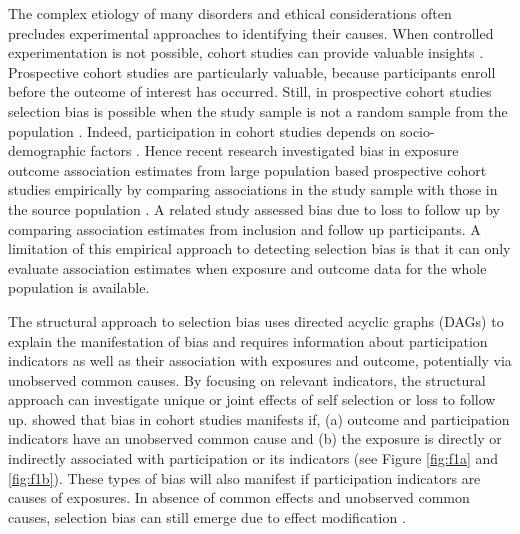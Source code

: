 \documentclass[]{article}
\begin{document}
The complex etiology of many disorders and ethical considerations often precludes experimental approaches to identifying their causes\supercite{Rothman2008-sq}. When controlled experimentation is not possible, cohort studies can provide valuable insights \supercite{Greenland2017-qr}. Prospective cohort studies are particularly valuable, because participants enroll before the outcome of interest has occurred. Still, in prospective cohort studies selection bias is possible when the study sample is not a random sample from the population \supercite{Hernan2004-oz}. Indeed, participation in cohort studies depends on socio-demographic factors \supercite{Galea2007-hv}. Hence recent research investigated bias in exposure outcome association estimates from large population based prospective cohort studies empirically by comparing associations in the study sample with those in the source population \supercite{Nilsen2009-ci, Nohr2006-uf, Hatch2016-us}.
A related study assessed bias due to loss to follow up by comparing association estimates from inclusion and follow up participants\supercite{Greene2011-am}. A limitation of this empirical approach to detecting selection bias is that it can only evaluate association estimates when exposure and outcome data for the whole population is available.

The structural approach to selection bias uses directed acyclic graphs (DAGs)\supercite{Pearl1995-ss} to explain the manifestation of bias and requires information about participation indicators as well as their association with exposures and outcome, potentially via unobserved common causes. By focusing on relevant indicators, the structural approach can investigate unique or joint effects of self selection or loss to follow up. \citeauthor{Hernan2004-oz}\supercite{Hernan2004-oz} showed that bias in cohort studies manifests if, (a) outcome and participation indicators have an unobserved common cause and (b) the exposure is directly or indirectly associated with participation or its indicators (see Figure \ref{fig:f1a} and \ref{fig:f1b}). These types of bias will also manifest if participation indicators are causes of exposures. In absence of common effects and unobserved common causes, selection bias can still emerge due to effect modification \supercite{Greenland1989-kd, VanderWeele2009-lm}.
\end{document}
